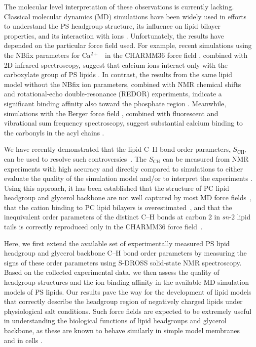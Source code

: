 \documentclass[journal=jpcbfk,manuscript=article]{achemso}
\begin{document}
The molecular level interpretation of these observations is currently lacking. Classical molecular dynamics (MD) simulations have been widely used in efforts 
to understand the PS headgroup structure, its influence on lipid bilayer properties, and its
interaction with
ions \cite{cascales96,pandit02,mukhopadhyay04,pedersen06,vernier09,boettcher11,molina12,jurkiewicz12,venable13,pan14,vangaveti14,melcrova16,valentine18,hallock18}.
Unfortunately, the results have depended on the particular force field used.
For example, recent simulations using the NBfix parameters for Ca$^{2+}$~\cite{kim16} in
the CHARMM36 force field \cite{klauda10,venable13}, combined with 2D infrared spectroscopy,
suggest that calcium ions interact only with the carboxylate group of PS lipids \cite{valentine18}. In contrast,
the results from the same lipid model without the NBfix ion parameters, combined with NMR chemical shifts and
rotational-echo double-resonance (REDOR) experiments, indicate a significant binding affinity also toward the phosphate region \cite{hallock18}.
Meanwhile, simulations with the Berger force field \cite{berger97,mukhopadhyay04},
combined with fluorescent and vibrational sum frequency spectroscopy, suggest substantial
calcium binding to the carbonyls in the acyl chains \cite{melcrova16}.

We have recently demonstrated that the lipid C--H bond order parameters, $S_\mathrm{CH}$,
can be used to resolve such controversies~\cite{botan15,catte16}. The $S_\mathrm{CH}$ can be
measured from NMR experiments with high accuracy and directly compared to simulations
to either evaluate the quality of the simulation model and/or to interpret the experiments \cite{ollila16}. Using this approach,
it has been established that the structure of PC lipid headgroup and glycerol backbone are not well
captured by most MD force fields~\cite{botan15}, that the cation binding to PC
lipid bilayers is overestimated~\cite{catte16}, and that the inequivalent order parameters of the distinct C--H bonds at
carbon 2 in {\it sn}-2 lipid tails is correctly reproduced only in the CHARMM36 force field~\cite{piggot17}.

Here, we first extend the available set of experimentally measured PS lipid headgroup and
glycerol backbone C--H bond order parameters
by measuring the signs of these order parameters using S-DROSS solid-state NMR spectroscopy.
Based on the collected experimental data, we then assess
the quality of headgroup structures and the ion binding affinity in
the available MD simulation models of PS lipids.
Our results pave the way
for the development of lipid models that correctly describe 
the headgroup region of negatively charged lipids under physiological salt
conditions. Such force fields are expected to be extremely useful in understanding
the biological functions of lipid headgroups and glycerol backbone, as
these are known to behave similarly in simple model membranes and in cells \cite{gally81,scherer87,seelig90}.
\end{document}
